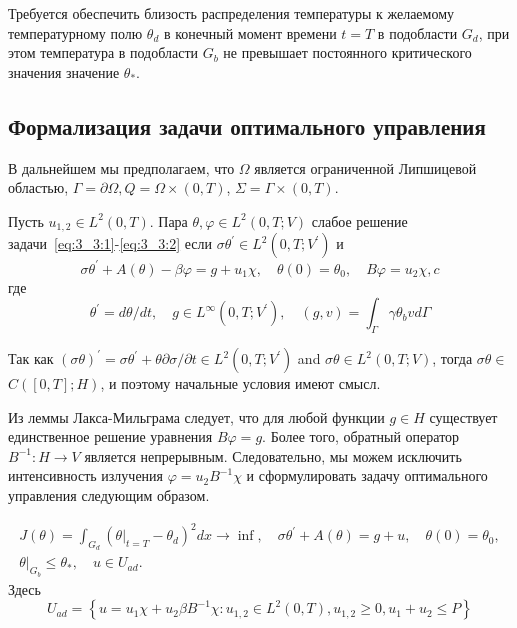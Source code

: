 Требуется обеспечить близость распределения температуры к желаемому температурному полю $\theta_{d}$
в конечный момент времени $t=T$ в подобласти $G_{d}$, при этом температура в подобласти $G_{b}$
не превышает постоянного критического значения значение $\theta_{*}$.

\subsection{Формализация задачи оптимального управления}\label{subsec:ch3:sec3:subsec2}

В дальнейшем мы предполагаем, что $\Omega $ является ограниченной Липшицевой областью,
$\Gamma =\partial \Omega, Q =\Omega \times(0, T)$, $\Sigma=\Gamma \times(0, T)$.

\begin{definition}
    Пусть $u_{1,2} \in L^{2}(0, T)$.
    Пара $\theta, \varphi \in L^{2}(0, T ; V)$ слабое решение задачи~\eqref{eq:3_3:1}-\eqref{eq:3_3:2} если
    $\sigma \theta^{\prime} \in L^{2}\left(0, T ; V^{\prime}\right)$ и
    \begin{equation}
        \label{eq:3_3:3}
        \sigma \theta^{\prime}+A(\theta)-\beta \varphi=g+u_{1} \chi,
        \quad \theta(0)=\theta_{0}, \quad B \varphi=u_{2} \chi,c
    \end{equation}
    где
    \[
        \theta^{\prime}=d \theta / d t, \quad g \in L^{\infty}\left(0, T ; V^{\prime}\right),
        \quad(g, v)=\int_{\Gamma} \gamma \theta_{b} v d \Gamma
    \]
\end{definition}

\begin{remark}
    Так как $(\sigma \theta)^{\prime}=\sigma \theta^{\prime}+\theta
    \partial \sigma / \partial t \in L^{2}\left(0, T ; V^{\prime}\right)$ and $\sigma
    \theta \in L^{2}(0, T ; V)$, тогда $\sigma \theta \in$ $C([0, T] ; H)$,
    и поэтому начальные условия имеют смысл.
\end{remark}

Из леммы Лакса-Мильграма следует, что для любой функции $g \in H$ существует единственное
решение уравнения $B\varphi= g$.
Более того, обратный оператор $B^{-1}: H \rightarrow V$ является непрерывным.
Следовательно, мы можем исключить интенсивность излучения $\varphi=u_{2} B^{-1} \chi$
и сформулировать задачу оптимального управления следующим образом.
\begin{definition}
\[
    \begin{gathered}
        J(\theta)=\int_{G_{d}}\left(\left.\theta\right|_{t=T}
        - \theta_{d}\right)^{2} d x \rightarrow \inf,
        \quad \sigma \theta^{\prime}+A(\theta)=g+u, \quad \theta(0)=\theta_{0}, \\
        \left.\theta\right|_{G_{b}} \leq \theta_{*}, \quad u \in U_{a d}.
    \end{gathered}
\]
Здесь
\[
    U_{a d}=\left\{u=u_{1} \chi+u_{2} \beta B^{-1} \chi: u_{1,2} \in L^{2}(0, T), u_{1,2}
    \geq 0, u_{1}+u_{2} \leq P\right\}
\]
\end{definition}

